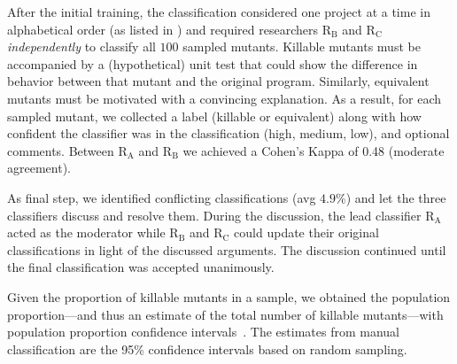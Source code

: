\documentclass[sigconf,review,anonymous]{acmart}
\newcommand{\rA}{\textsc{R$_\text{A}$}\xspace}
\newcommand{\rB}{\textsc{R$_\text{B}$}\xspace}
\newcommand{\rC}{\textsc{R$_\text{C}$}\xspace}
\begin{document}
After the initial training, the classification considered one project at a time in alphabetical order
(as listed in ) and required researchers \rB and \rC \emph{independently}
to classify all $100$ sampled mutants. %
%
Killable mutants must be accompanied by a (hypothetical) unit test that could show the difference
in behavior between that mutant and the original program. Similarly, equivalent mutants must be
motivated with a convincing explanation. %
%
As a result, for each sampled mutant, we collected %
a label (killable or equivalent) along with how confident the classifier was in the classification (high, medium, low), %
and optional comments.
Between \rA and \rB we achieved a Cohen's Kappa of 0.48 (moderate agreement).

As final step, we identified conflicting classifications (avg $4.9\%$) %
and let the three classifiers discuss and resolve them. 
%
During the discussion, the lead classifier \rA acted as the moderator while 
\rB and \rC could update their original classifications in light of the discussed
arguments. The discussion continued until the final classification was accepted unanimously. 
%

Given the proportion of killable mutants in a sample, we obtained the population proportion---and thus an estimate of the total number of killable
mutants---with population proportion confidence intervals~\cite{ott2015introduction}.
%
The estimates from manual classification are the 95\% confidence intervals based on random sampling.
\end{document}
